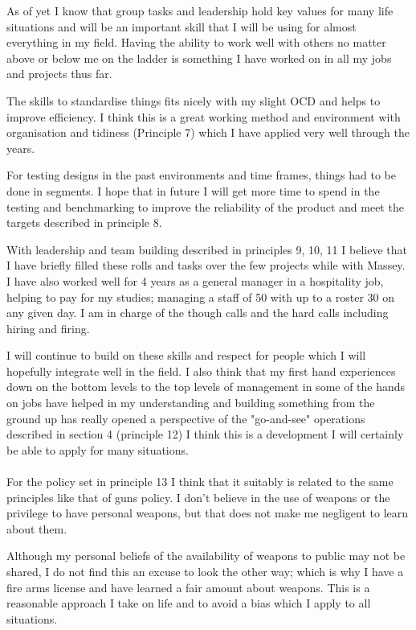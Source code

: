 \documentclass[a4paper, 10pt]{IEEEconf}
\begin{document}
As of yet I know that group tasks and leadership hold key values for many life situations and will be an important skill that I will be using for almost everything in my field. Having the ability to work well with others no matter above or below me on the ladder is something I have worked on in all my jobs and projects thus far. 

The skills to standardise things fits nicely with my slight OCD and helps to improve efficiency. I think this is a great working method and environment with organisation and tidiness (Principle 7) which I have applied very well through the years.

For testing designs in the past environments and time frames, things had to be done in segments. I hope that in future I will get more time to spend in the testing and benchmarking to improve the reliability of the product and meet the targets described in principle 8.

With leadership and team building described in principles 9, 10, 11 I believe that I have briefly filled these rolls and tasks over the few projects while with Massey. I have also worked well for 4 years as a general manager in a hospitality job, helping to pay for my studies; managing a staff of 50 with up to a roster 30 on any given day. I am in charge of the though calls and the hard calls including hiring and firing. 

I will continue to build on these skills and respect for people which I will hopefully integrate well in the field. I also think that my first hand experiences down on the bottom levels to the top levels of management in some of the hands on jobs have helped in my understanding and building something from the ground up has really opened a perspective of the "go-and-see" operations described in section 4 (principle 12) I think this is a development I will certainly be able to apply for many situations.
\\
\\

For the policy set in principle 13 I think that it suitably is related to the same principles like that of guns policy. I don't believe in the use of weapons or the privilege to have personal weapons, but that does not make me negligent to learn about them. 

Although my personal beliefs of the availability of weapons to public may not be shared, I do not find this an excuse to look the other way; which is why I have a fire arms license and have learned a fair amount about weapons. This is a reasonable approach I take on life and to avoid a bias which I apply to all situations. 
\end{document}
